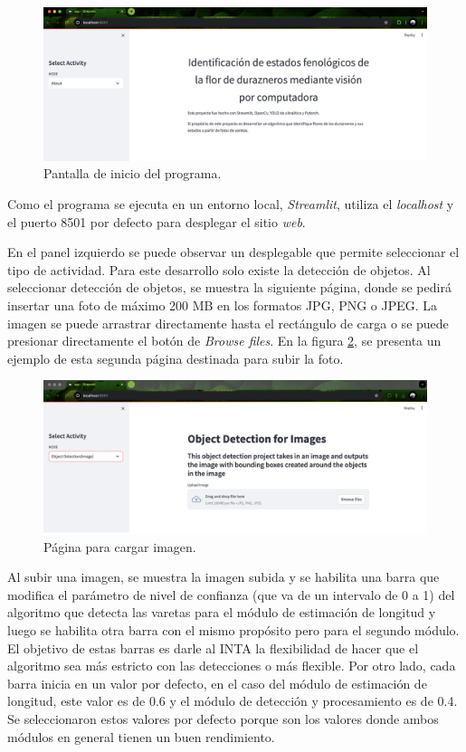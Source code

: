 \begin{figure}[ht]
	\centering
	\includegraphics[scale=0.13]{./Figures/pantallaInicio.png}
	\caption{Pantalla de inicio del programa.}
	\label{fig:pantallaInicio}
\end{figure}

Como el programa se ejecuta en un entorno local, \textit{Streamlit}, utiliza el \textit{localhost} y el puerto 8501 por defecto para desplegar el sitio \textit{web}.

En el panel izquierdo se puede observar un desplegable que permite seleccionar el tipo de actividad. Para este desarrollo solo existe la detección de objetos. Al seleccionar detección de objetos, se muestra la siguiente página, donde se pedirá insertar una foto de máximo 200 MB en los formatos JPG, PNG o JPEG. La imagen se puede arrastrar directamente hasta el rectángulo de carga o se puede presionar directamente el botón de \textit{Browse files}. En la figura \ref{fig:pantalla2}, se presenta un ejemplo de esta segunda página destinada para subir la foto.

\begin{figure}[ht]
	\centering
	\includegraphics[scale=0.13]{./Figures/pantalla2.png}
	\caption{Página para cargar imagen.}
	\label{fig:pantalla2}
\end{figure}

Al subir una imagen, se muestra la imagen subida y se habilita una barra que modifica el parámetro de nivel de confianza (que va de un intervalo de 0 a 1) del algoritmo que detecta las varetas para el módulo de estimación de longitud y luego se habilita otra barra con el mismo propósito pero para el segundo módulo. El objetivo de estas barras es darle al INTA la flexibilidad de hacer que el algoritmo sea más estricto con las detecciones o más flexible. Por otro lado, cada barra inicia en un valor por defecto, en el caso del módulo de estimación de longitud, este valor es de 0.6 y el módulo de detección y procesamiento es de 0.4. Se seleccionaron estos valores por defecto porque son los valores donde ambos módulos en general tienen un buen rendimiento.

